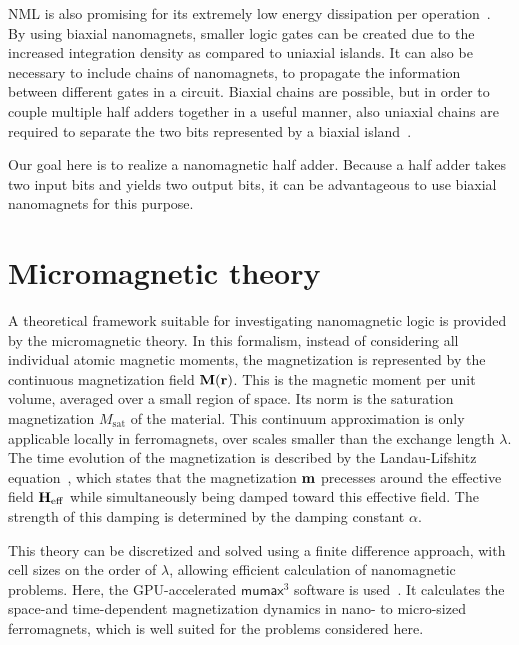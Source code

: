 \documentclass[twocolumn]{phdsymp}
\newcommand{\mumax}{$\mathsf{mumax}^3$}
\begin{document}
NML is also promising for its extremely low energy dissipation per operation~\cite{MQCA_RoomTemp,SubnanosecondPropagation_AnisotropyChains,FourStateLogic}. By using biaxial nanomagnets, smaller logic gates can be created due to the increased integration density as compared to uniaxial islands. It can also be necessary to include chains of nanomagnets, to propagate the information between different gates in a circuit. Biaxial chains are possible, but in order to couple multiple half adders together in a useful manner, also uniaxial chains are required to separate the two bits represented by a biaxial island~\cite{GYP-18,MQCA_MajorityGate,SwitchingForced_EnergyEfficient,MQCA_ImageRecognition}. \par
Our goal here is to realize a nanomagnetic half adder. Because a half adder takes two input bits and yields two output bits, it can be advantageous to use biaxial nanomagnets for this purpose.



\section{Micromagnetic theory}
A theoretical framework suitable for investigating nanomagnetic logic is provided by the micromagnetic theory. In this formalism, instead of considering all individual atomic magnetic moments, the magnetization is represented by the continuous magnetization field $\vb{M}(\vb{r})$. This is the magnetic moment per unit volume, averaged over a small region of space. Its norm is the saturation magnetization $M_{\mathrm{sat}}$ of the material. This continuum approximation is only applicable locally in ferromagnets, over scales smaller than the exchange length $\lambda$. The time evolution of the magnetization is described by the Landau-Lifshitz equation~\cite{lifdau}, which states that the magnetization $\vb{m}$ precesses around the effective field $\vb{H_{\mathrm{eff}}}$ while simultaneously being damped toward this effective field. The strength of this damping is determined by the damping constant $\alpha$. \par
This theory can be discretized and solved using a finite difference approach, with cell sizes on the order of $\lambda$, allowing efficient calculation of nanomagnetic problems. Here, the GPU-accelerated \mumax{} software is used~\cite{MuMax3}. It calculates the space-and time-dependent magnetization dynamics in nano- to micro-sized ferromagnets, which is well suited for the problems considered here.
\end{document}
